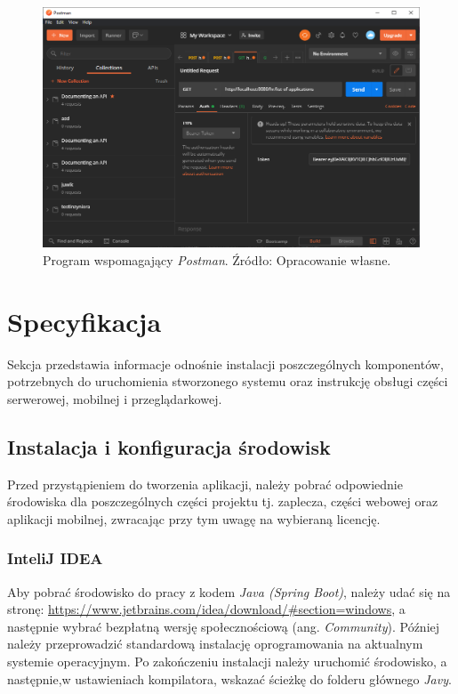 \documentclass[twoside]{projektInzynierskiMS}
\numberwithin{figure}{section}
\begin{document}
\begin{figure}[h!]
  \centering
  \includegraphics[scale=0.55]{images/postman.png}
    \caption{Program wspomagający \textit{Postman}. Źródło: Opracowanie własne.}
    \label{fig:postman}
\end{figure}

\section{Specyfikacja}
Sekcja przedstawia informacje odnośnie instalacji poszczególnych komponentów, potrzebnych do uruchomienia stworzonego systemu oraz instrukcję obsługi części serwerowej, mobilnej i przeglądarkowej.

\subsection{Instalacja i konfiguracja środowisk}
Przed przystąpieniem do tworzenia aplikacji, należy pobrać odpowiednie środowiska dla poszczególnych części projektu tj. zaplecza, części webowej oraz aplikacji mobilnej, zwracając przy tym uwagę na wybieraną licencję.

\subsubsection{InteliJ IDEA}
Aby pobrać środowisko do pracy z kodem \textit{Java (Spring Boot)}, należy udać się na stronę: \url{https://www.jetbrains.com/idea/download/\#section=windows}, a następnie wybrać bezpłatną wersję społecznościową (ang. \textit{Community}). Później należy przeprowadzić standardową instalację oprogramowania na aktualnym systemie operacyjnym. Po zakończeniu instalacji należy uruchomić środowisko, a następnie,\linebreak w ustawieniach kompilatora, wskazać ścieżkę do folderu głównego \textit{Javy}.
\end{document}
